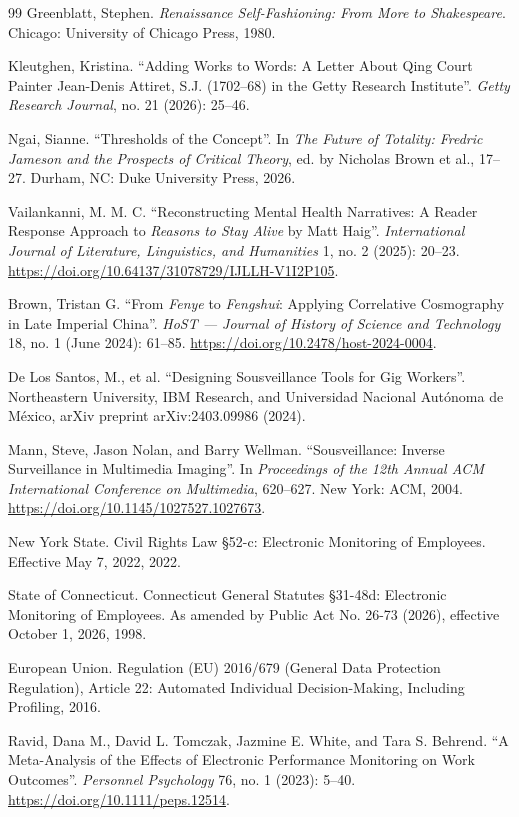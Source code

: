 \documentclass[10pt]{article}
\begin{document}
\begin{thebibliography}{99}
 Greenblatt, Stephen. \emph{Renaissance Self-Fashioning: From More to Shakespeare}. Chicago: University of Chicago Press, 1980.

 Kleutghen, Kristina. ``Adding Works to Words: A Letter About Qing Court Painter Jean-Denis Attiret, S.J. (1702--68) in the Getty Research Institute''. \emph{Getty Research Journal}, no. 21 (2026): 25--46.

 Ngai, Sianne. ``Thresholds of the Concept''. In \emph{The Future of Totality: Fredric Jameson and the Prospects of Critical Theory}, ed. by Nicholas Brown et al., 17--27. Durham, NC: Duke University Press, 2026.

 Vailankanni, M. M. C. ``Reconstructing Mental Health Narratives: A Reader Response Approach to \emph{Reasons to Stay Alive} by Matt Haig''. \emph{International Journal of Literature, Linguistics, and Humanities} 1, no. 2 (2025): 20--23. \url{https://doi.org/10.64137/31078729/IJLLH-V1I2P105}.

 Brown, Tristan G. ``From \emph{Fenye} to \emph{Fengshui}: Applying Correlative Cosmography in Late Imperial China''. \emph{HoST --- Journal of History of Science and Technology} 18, no. 1 (June 2024): 61--85. \url{https://doi.org/10.2478/host-2024-0004}.

 De Los Santos, M., et al. ``Designing Sousveillance Tools for Gig Workers''. Northeastern University, IBM Research, and Universidad Nacional Aut\'onoma de M\'exico, arXiv preprint arXiv:2403.09986 (2024).

 Mann, Steve, Jason Nolan, and Barry Wellman. ``Sousveillance: Inverse Surveillance in Multimedia Imaging''. In \emph{Proceedings of the 12th Annual ACM International Conference on Multimedia}, 620--627. New York: ACM, 2004. \url{https://doi.org/10.1145/1027527.1027673}.

 New York State. Civil Rights Law \S 52-c: Electronic Monitoring of Employees. Effective May 7, 2022, 2022.

 State of Connecticut. Connecticut General Statutes \S 31-48d: Electronic Monitoring of Employees. As amended by Public Act No. 26-73 (2026), effective October 1, 2026, 1998.

 European Union. Regulation (EU) 2016/679 (General Data Protection Regulation), Article 22: Automated Individual Decision-Making, Including Profiling, 2016.

 Ravid, Dana M., David L. Tomczak, Jazmine E. White, and Tara S. Behrend. ``A Meta-Analysis of the Effects of Electronic Performance Monitoring on Work Outcomes''. \emph{Personnel Psychology} 76, no. 1 (2023): 5--40. \url{https://doi.org/10.1111/peps.12514}.


\end{thebibliography}
\end{document}
